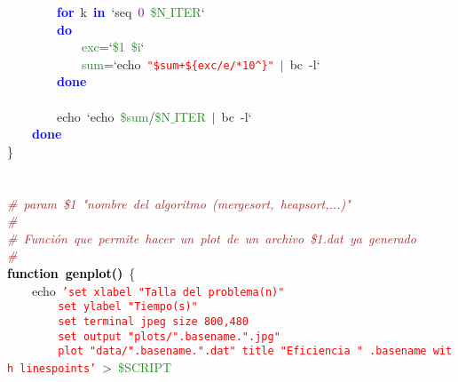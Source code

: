 \mbox{}\ \ \ \ \ \ \ \ \textbf{\textcolor{Blue}{for}}\ k\ \textbf{\textcolor{Blue}{in}}\ `seq\ \textcolor{Purple}{0}\ \textcolor{ForestGreen}{\$N$\_$ITER}` \\
\mbox{}\ \ \ \ \ \ \ \ \textbf{\textcolor{Blue}{do}} \\
\mbox{}\ \ \ \ \ \ \ \ \ \ \ \ \textcolor{ForestGreen}{exc}\textcolor{BrickRed}{=}`\textcolor{ForestGreen}{\$1}\ \textcolor{ForestGreen}{\$i}` \\
\mbox{}\ \ \ \ \ \ \ \ \ \ \ \ \textcolor{ForestGreen}{sum}\textcolor{BrickRed}{=}`echo\ \texttt{\textcolor{Red}{"{}\$sum+\$\{exc/e/*10\textasciicircum{}\}"{}}}\ \textcolor{BrickRed}{$|$}\ bc\ -l` \\
\mbox{}\ \ \ \ \ \ \ \ \textbf{\textcolor{Blue}{done}} \\
\mbox{}\ \ \ \ \ \ \ \  \\
\mbox{}\ \ \ \ \ \ \ \ echo\ `echo\ \textcolor{ForestGreen}{\$sum}\textcolor{BrickRed}{/}\textcolor{ForestGreen}{\$N$\_$ITER}\ \textcolor{BrickRed}{$|$}\ bc\ -l` \\
\mbox{}\ \ \ \ \textbf{\textcolor{Blue}{done}} \\
\mbox{}\} \\
\mbox{} \\
\mbox{} \\
\mbox{}\textit{\textcolor{Brown}{\#\ param\ \$1\ "{}nombre\ del\ algoritmo\ (mergesort,\ heapsort,...)"{}}} \\
\mbox{}\textit{\textcolor{Brown}{\#}} \\
\mbox{}\textit{\textcolor{Brown}{\#\ Función\ que\ permite\ hacer\ un\ plot\ de\ un\ archivo\ \$1.dat\ ya\ generado}} \\
\mbox{}\textit{\textcolor{Brown}{\#}} \\
\mbox{}\textbf{\textcolor{Black}{function\ genplot()}}\ \{ \\
\mbox{}\ \ \ \ echo\ \texttt{\textcolor{Red}{'set\ xlabel\ "{}Talla\ del\ problema(n)"{}}} \\
\mbox{}\texttt{\textcolor{Red}{\ \ \ \ \ \ \ \ set\ ylabel\ "{}Tiempo(s)"{}}} \\
\mbox{}\texttt{\textcolor{Red}{\ \ \ \ \ \ \ \ set\ terminal\ jpeg\ size\ 800,480}} \\
\mbox{}\texttt{\textcolor{Red}{\ \ \ \ \ \ \ \ set\ output\ "{}plots/"{}.basename."{}.jpg"{}}} \\
\mbox{}\texttt{\textcolor{Red}{\ \ \ \ \ \ \ \ plot\ "{}data/"{}.basename."{}.dat"{}\ title\ "{}Eficiencia\ "{}\ .basename\ with\ linespoints'}}\ \textcolor{BrickRed}{\textgreater{}}\ \textcolor{ForestGreen}{\$SCRIPT} \\
